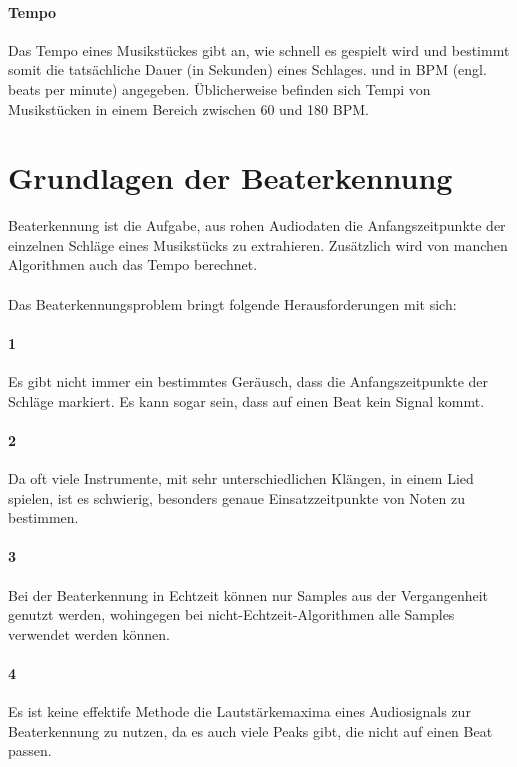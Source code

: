 {	\paragraph{Tempo}
	{
		Das Tempo eines Musikstückes gibt an,
			wie schnell es gespielt wird
			und bestimmt somit die tatsächliche Dauer (in Sekunden) eines Schlages.
			und in BPM (engl. beats per minute) angegeben.
		Üblicherweise befinden sich Tempi von Musikstücken in einem Bereich zwischen 60 und 180 BPM.
	}
}

\section{Grundlagen der Beaterkennung}
{
	Beaterkennung ist die Aufgabe,
		aus rohen Audiodaten die Anfangszeitpunkte der einzelnen Schläge eines Musikstücks zu extrahieren.
	Zusätzlich wird von manchen Algorithmen auch das Tempo berechnet.

	\paragraph{}
	{
		Das Beaterkennungsproblem bringt folgende Herausforderungen mit sich:
	}

	\paragraph{1} %
	{
		Es gibt nicht immer ein bestimmtes Geräusch,
			dass die Anfangszeitpunkte der Schläge markiert.
		Es kann sogar sein, dass auf einen Beat kein Signal kommt.
	}

	\paragraph{2} %
	{
		Da oft viele Instrumente, mit sehr unterschiedlichen Klängen, in einem Lied spielen,
			ist es schwierig,
			besonders genaue Einsatzzeitpunkte von Noten zu bestimmen.
	}

	\paragraph{3} %
	{
		Bei der Beaterkennung in Echtzeit können nur Samples aus der Vergangenheit genutzt werden,
			wohingegen bei nicht-Echtzeit-Algorithmen alle Samples verwendet werden können.
	}

	\paragraph{4} %
	{
		Es ist keine effektife Methode die Lautstärkemaxima eines Audiosignals zur Beaterkennung zu nutzen,
			da es auch viele Peaks gibt,
			die nicht auf einen Beat passen.
	}

}
